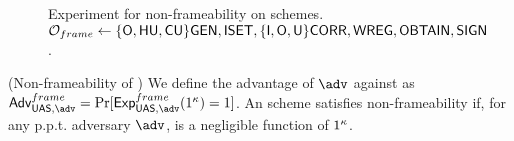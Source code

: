 \begin{figure}[htp!]  
  \centering
  \caption{Experiment for non-frameability on \UAS schemes.
    $\mathcal{O}_{frame} \gets \lbrace\mathsf{O},\mathsf{HU},\mathsf{CU}\rbrace\mathsf{GEN},\mathsf{ISET},\lbrace\mathsf{I},\mathsf{O},\mathsf{U}\rbrace
    \mathsf{CORR},\mathsf{WREG},\mathsf{OBTAIN},\mathsf{SIGN}$.}
  \label{fig:exp-uas-frame}
\end{figure}

\begin{definition}{(Non-frameability of \UAS)}
  \label{def:frame-uas}
  We define the advantage \AdvNonframe of $\adv$ against \ExpNonframe as
  $\AdvNonframe=\Pr\lbrack\ExpNonframe(1^\secpar)=1\rbrack$.
  An \UAS scheme satisfies non-frameability if, for any p.p.t. adversary $\adv$,
  \AdvNonframe is a negligible function of $1^\kappa$.
\end{definition}

